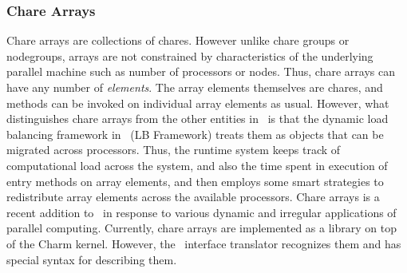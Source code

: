 \subsubsection{Chare Arrays}

Chare arrays are collections of chares. However unlike chare groups or
nodegroups, arrays are not constrained by characteristics of the underlying
parallel machine such as number of processors or nodes. Thus, chare arrays can
have any number of {\em elements}. The array elements themselves are chares,
and methods can be invoked on individual array elements as usual. However, what
distinguishes chare arrays from the other entities in \charmpp\ is that the
dynamic load balancing framework in \charmpp\ (LB Framework) treats them as
objects that can be migrated across processors. Thus, the runtime system keeps
track of computational load across the system, and also the time spent in
execution of entry methods on array elements, and then employs some smart
strategies to redistribute array elements across the available processors.
Chare arrays is a recent addition to \charmpp\ in response to various dynamic
and irregular applications of parallel computing. Currently, chare arrays are
implemented as a library on top of the Charm kernel. However, the \charmpp\
interface translator recognizes them and has special syntax for describing
them.

